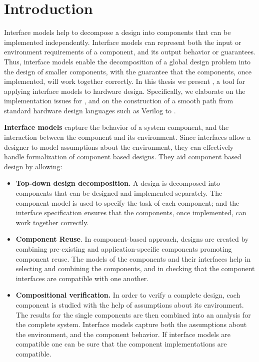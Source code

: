 \chapter{Introduction}
Interface models \cite{cav-paper} help to decompose a design into
components that can be implemented independently. Interface models
can represent both the input or environment requirements of a
component, and its output behavior or guarantees. Thus, interface
models enable the decomposition of a global design problem into
the design of smaller components, with the guarantee that the
components, once implemented, will work together correctly. In
this thesis we present \chai, a tool for applying interface models
to hardware design.  Specifically, we elaborate on the
implementation issues for \chai, and on the construction of a
smooth path from standard hardware design languages such as
Verilog to \chai.

\textbf{Interface models} capture the behavior of a system
component, and the interaction between the component and its
environment. Since interfaces allow a designer to model
assumptions about the environment, they can effectively handle
formalization of component based designs. They aid component based
design by allowing:
\begin{itemize}
\item {\bf Top-down design decomposition.} A design is decomposed
into components that can be designed and implemented separately.
The component model is used to specify the task of each component;
and the interface specification ensures that the components, once
implemented, can work together correctly.

 \item {\bf Component Reuse}. In component-based approach, designs are
created by combining pre-existing and application-specific components
promoting component reuse. The models of the components and their
interfaces help in selecting and combining the components, and in
checking that the component interfaces are compatible with one
another.

\item {\bf Compositional verification.} In order to verify a
complete design, each component is studied with the help of
assumptions about its environment. The results for the single
components are then combined into an analysis for the complete
system. Interface models capture both the assumptions about the
environment, and the component behavior. If interface models are
compatible one can be sure that the component implementations are
compatible.
\end{itemize}

